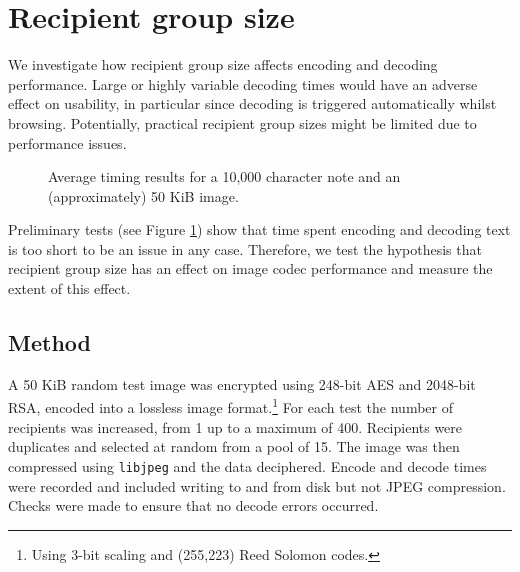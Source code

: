 \FloatBarrier
\section{Recipient group size}
\label{sec:recsize}

We investigate how recipient group size affects encoding and decoding performance. Large or highly variable decoding times would have an adverse effect on usability, in particular since decoding is triggered automatically whilst browsing. Potentially, practical recipient group sizes might be limited due to performance issues.

\begin{figure}[tbph]
    \begin{center}
    \caption{Average timing results for a 10,000 character note and an (approximately) 50 KiB image.}
    \label{graph:txt-sync}
  \end{center}
\end{figure}

Preliminary tests (see Figure \ref{graph:txt-sync}) show that time spent encoding and decoding text is too short to be an issue in any case. Therefore, we test the hypothesis that recipient group size has an  effect on image codec performance and measure the extent of this effect.



\subsection{Method}

A 50 KiB random test image was encrypted using 248-bit AES and 2048-bit RSA, encoded into a lossless image format.\footnote{Using 3-bit scaling and (255,223) Reed Solomon codes.} For each test the number of recipients was increased, from 1 up to a maximum of 400. Recipients were duplicates and selected at random from a pool of 15. The image was then compressed using {\tt libjpeg} and the data deciphered. Encode and decode times were recorded and included writing to and from disk but not JPEG compression. Checks were made to ensure that no decode errors occurred.

